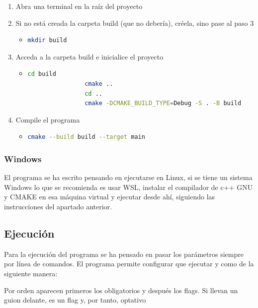 \documentclass[a4paper, 12.5pt]{report}
\begin{document}
\begin{enumerate}
	\item Abra una terminal en la raíz del proyecto
	\item Si no está creada la carpeta build (que no debería), créela, sino pase al paso 3
	      \begin{itemize}
		      \item \begin{lstlisting}[language=bash]
				mkdir build
				\end{lstlisting}
	      \end{itemize}
	\item Acceda a la carpeta build e inicialice el proyecto
	      \begin{itemize}
		      \item \begin{lstlisting}[language=bash]
				cd build
				cmake ..
				cd ..
				cmake -DCMAKE_BUILD_TYPE=Debug -S . -B build
				\end{lstlisting}
	      \end{itemize}
	\item Compile el programa
	      \begin{itemize}
		      \item \begin{lstlisting}[language=bash]
				cmake --build build --target main
				\end{lstlisting}
	      \end{itemize}
\end{enumerate}

\subsubsection{Windows}

El programa se ha escrito pensando en ejecutarse en Linux, si se tiene un sistema Windows lo que se recomienda es usar WSL, instalar el compilador de c++ GNU y CMAKE en esa máquina virtual y ejecutar desde ahí, siguiendo las instrucciones del apartado anterior.


\subsection{Ejecución}

Para la ejecución del programa se ha pensado en pasar los parámetros siempre por línea de comandos. El programa permite configurar que ejecutar y como de la siguiente manera:

Por orden aparecen primeros los obligatorios y después los flags. Si llevan un guion delante, es un flag y, por tanto, optativo
\end{document}
